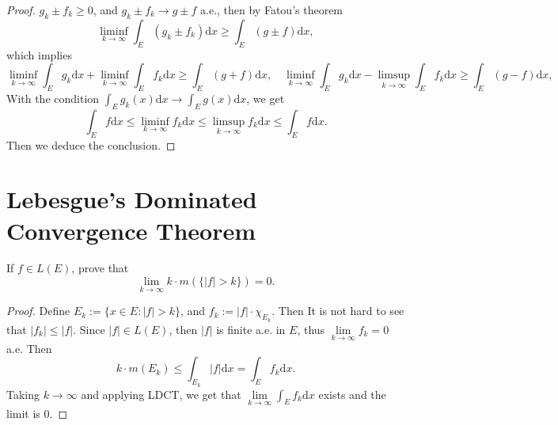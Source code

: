 \begin{proof}
  $g_k \pm f_k \geq 0$, and $g_k \pm f_k \rightarrow g \pm f$ a.e., then by Fatou's theorem
  \begin{equation}
    \liminf_{k \rightarrow \infty} \int_E (g_k \pm f_k)\mathrm{d} x \geq \int_E (g \pm f)\mathrm{d} x,
  \end{equation}
  which implies
  \begin{equation}
    \liminf_{k \rightarrow \infty} \int_E g_k \mathrm{d} x
    + \liminf_{k \rightarrow \infty} \int_E f_k \mathrm{d} x
    \geq \int_E (g + f)\mathrm{d} x,
    \quad
    \liminf_{k \rightarrow \infty} \int_E g_k \mathrm{d} x
    - \limsup_{k \rightarrow \infty} \int_E f_k \mathrm{d} x
    \geq \int_E (g - f)\mathrm{d} x,
  \end{equation}
  With the condition $\int_E g_k(x) \mathrm{d} x \rightarrow \int_E g(x)\mathrm{d} x$,
  we get
  \begin{equation}
    \int_E f \mathrm{d} x \leq \liminf_{k \rightarrow \infty} f_k \mathrm{d} x
    \leq \limsup_{k \rightarrow \infty}f_k \mathrm{d} x \leq \int_E f \mathrm{d} x.
  \end{equation}
  Then we deduce the conclusion.
\end{proof}


\section{Lebesgue's Dominated Convergence Theorem}

\begin{exercise}{}{}
  If $f \in L(E)$, prove that
  \begin{equation}
    \lim \limits _{k \rightarrow \infty} k \cdot m(\{|f| > k\}) = 0.
  \end{equation}
\end{exercise}

\begin{proof}
  Define $E_k := \{x \in E: |f| > k\}$, and $f_k := |f| \cdot \chi_{E_k}$.
  Then It is not hard to see that $|f_k| \leq |f|$.
  Since $|f| \in L(E)$, then $|f|$ is finite a.e. in $E$,
  thus $\lim \limits _{k \rightarrow \infty} f_k = 0$ a.e.
  Then
  \begin{equation}
    k \cdot m(E_k) \leq \int_{E_k} |f| \mathrm{d} x = \int_E f_k \mathrm{d} x.
  \end{equation}
  Taking $k \rightarrow \infty$ and applying LDCT,
  we get that $\lim \limits _{k \rightarrow \infty} \int_E f_k \mathrm{d} x$ exists and the limit is $0$.
\end{proof}

